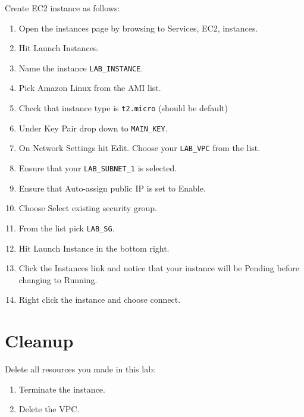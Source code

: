 Create EC2 instance as follows:
\begin{enumerate}
\item Open the instances page by browsing to Services, EC2, instances.

\item Hit Launch Instances.

\item Name the instance \texttt{LAB\_INSTANCE}.

\item Pick Amazon Linux from the AMI list.

\item Check that instance type is \texttt{t2.micro} (should be default)

\item Under Key Pair drop down to \texttt{MAIN\_KEY}.

\item On Network Settings hit Edit. Choose your \texttt{LAB\_VPC} from the list.

\item Ensure that your \texttt{LAB\_SUBNET\_1} is selected.

\item Ensure that Auto-assign public IP is set to Enable.
  
\item Choose Select existing security group.

\item From the list pick \texttt{LAB\_SG}.

\item Hit Launch Instance in the bottom right.

\item Click the Instances link and notice that your instance will be Pending before changing to Running.

\item Right click the instance and choose connect.
  
\end{enumerate}


\section{Cleanup}

Delete all resources you made in this lab:
\begin{enumerate}
\item Terminate the instance.
\item Delete the VPC.
\end{enumerate}

